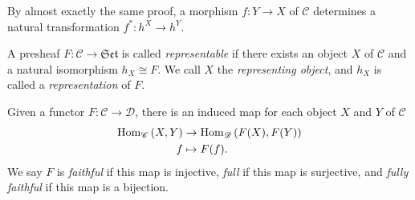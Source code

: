 \documentclass[dissertation.tex]{subfiles}
\begin{document}
\begin{rmk}
  By almost exactly the same proof, a morphism $f : Y \rightarrow X$ of $\mathscr{C}$ determines a natural transformation $f^* : h^X \rightarrow h^Y$.
\end{rmk}


%  

\begin{defn}
  A presheaf $F \colon \mathscr{C} \rightarrow \mathfrak{Set}$ is called {\em representable} if there exists an object $X$ of $\mathscr{C}$ and a natural isomorphism $h_X \cong F$.
  We call $X$ the {\em representing object}, and $h_X$ is called a {\em representation} of $F$.
\end{defn}

\begin{defn}
  Given a functor $F : \mathscr{C} \rightarrow \mathscr{D}$, there is an induced map for each object $X$ and $Y$ of $\mathscr{C}$
  \begin{align*}
    \operatorname{Hom}_{\mathscr{C}}\left(X,Y\right) &\rightarrow \operatorname{Hom}_{\mathscr{D}}\left(F(X), F(Y)\right)\\
    f &\mapsto F(f).
  \end{align*}
  We say $F$ is {\em faithful} if this map is injective, {\em full} if this map is surjective, and {\em fully faithful} if this map is a bijection.
\end{defn}
\end{document}
